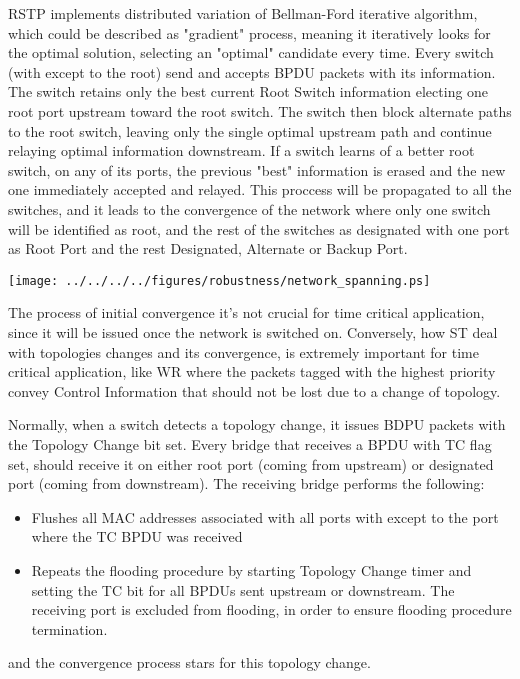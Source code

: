 RSTP implements distributed variation of Bellman-Ford iterative
algorithm, which could be described as "gradient" process, meaning it iteratively looks for the
optimal solution, selecting an "optimal" candidate every time. Every switch
(with except to the root) send and  accepts BPDU packets
with its information. The switch retains only the best current Root Switch
information electing one root port upstream toward the root switch. The switch
then block alternate paths to the root switch, leaving only the single optimal
upstream path and continue relaying optimal information downstream. If a switch
learns of a better root switch, on any of its ports, the previous "best"
information is erased and the new one immediately accepted and relayed. This
proccess will be propagated to all the switches, and it leads to the convergence
of the network where only one switch will be identified as root, and the rest of
the switches as designated with one port as Root Port and the rest Designated,
Alternate or Backup Port.


\begin{center}
        \texttt{[image: ../../../../figures/robustness/network\_spanning.ps]}
        \label{fig:free_loops}
\end{center}

The process of initial convergence it's not crucial for time
critical application, since it will be issued once the network is switched on.
Conversely, how ST deal with topologies changes and its
convergence, is extremely important for time critical application, like WR where
the packets tagged with the highest priority convey Control Information that
should not be lost due to a change of topology.

Normally, when a switch detects a topology change, it issues BDPU packets with
the Topology Change bit set. Every bridge that receives a BPDU with TC flag set,
should  receive it on either root port (coming from upstream) or designated port
(coming from downstream). The receiving bridge performs the following:
\begin{itemize}

        \item Flushes all MAC addresses associated with all ports with except to
the port where the TC BPDU was received
        \item Repeats the flooding procedure by starting Topology Change timer
and setting the TC bit for all BPDUs sent upstream or downstream. The receiving
port is excluded from flooding, in order to ensure flooding procedure
termination.
\end{itemize}
and the convergence process stars for this topology change. 



